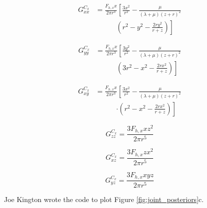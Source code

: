 \documentclass[twocolumn,jgrga]{AGUTeX}
\begin{document}
\begin{article}
{{{\begin{equation}
\begin{split}
G_{xx}^{C_x} &= \frac{ F_{h,x} x }{2 \pi r^3} \left[ \frac{ 3x^2}{r^2} \right.
- \frac{\mu}{(\lambda + \mu)(z+r)^2} 
\\
&\qquad \quad  \left. (r^2 - y^2 - \frac{2ry^2}{r+z}) \right]
\end{split}
\end{equation}

\begin{equation}
\begin{split}
G_{yy}^{C_x} & = \frac{ F_{h,x} x }{2 \pi r^3} \left[ \frac{ 3y^2}{r^2} \right.
- \frac{\mu}{(\lambda + \mu)(z+r)^2} \\
& \qquad \quad \left. (3r^2 - x^2 - \frac{2rx^2}{r+z}) \right]
\end{split}
\end{equation}

\begin{equation}
\begin{split}
G_{xy}^{C_x} & = \frac{ F_{h,x} x }{2 \pi r^3} \left[ \frac{ 3x^2}{r^2} \right.
- \frac{\mu}{(\lambda + \mu)(z+r)^2} 
\\
&\qquad \quad \left. \cdot (r^2 - x^2 - \frac{2rx^2}{r+z}) \right]
\end{split}
\end{equation}

\begin{equation}
    G^{C_x}_{zz} = \frac{ 3 F_{h,x} x z^2 }{2 \pi r^5}
\end{equation}

\begin{equation}
    G^{C_x}_{xz} = \frac{ 3 F_{h,x} z x^2 }{2 \pi r^5}
\end{equation}

\begin{equation}
    G^{C_x}_{yz} = \frac{ 3 F_{h,x} x y z }{2 \pi r^5}
\end{equation}

\begin{acknowledgements}
Joe Kington wrote the code to plot Figure \ref{fig:joint_posteriors}c.
\end{acknowledgements}

%

}}}
\end{article}
\end{document}
